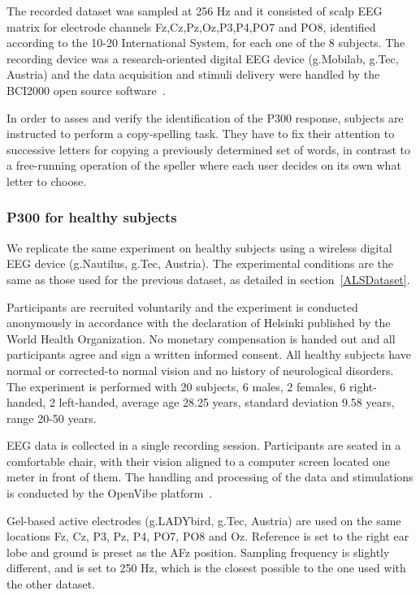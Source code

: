 \documentclass[entropy,article,submit,moreauthors,pdftex,10pt,a4paper]{mdpi}
\begin{document}
The recorded dataset was sampled at 256 Hz and it consisted of scalp EEG matrix for electrode channels Fz,Cz,Pz,Oz,P3,P4,PO7 and PO8, identified according to the 10-20 International System,  for each one of the 8 subjects.   The recording device was a research-oriented digital EEG device (g.Mobilab, g.Tec, Austria) and the data acquisition and stimuli delivery were handled by the BCI2000 open source software~\citep{Schalk2004}.

In order to asses and verify the identification of the P300 response, subjects are instructed to perform a copy-spelling task. They have to fix their attention to successive letters for copying a previously determined set of words, in contrast to a free-running operation of the speller where each user decides on its own what letter to choose.

\subsubsection{P300 for healthy subjects}

We replicate the same experiment on healthy subjects using a wireless digital EEG device (g.Nautilus, g.Tec, Austria).  The experimental conditions are the same as those used for the previous dataset, as detailed in section~\ref{ALSDataset}.

Participants are recruited voluntarily and the experiment is conducted anonymously in accordance with the declaration of Helsinki published by the World Health Organization.  No monetary compensation is handed out and all participants agree and sign a written informed consent.  All healthy subjects have normal or corrected-to normal vision and no history of neurological disorders. The experiment is performed with 20 subjects, 6 males, 2 females, 6 right-handed, 2 left-handed, average age 28.25 years, standard deviation  9.58 years, range 20-50 years.

EEG data is collected in a single recording session. Participants are seated in a comfortable chair, with their vision aligned to a computer screen located one meter in front of them.  The handling and processing of the data and stimulations is conducted by the OpenVibe platform~\citep{Renard2010}. 

Gel-based active electrodes (g.LADYbird, g.Tec, Austria) are used on the same locations Fz, Cz, P3, Pz, P4, PO7, PO8 and Oz.  Reference is set to the right ear lobe and ground is preset as the AFz position.   Sampling frequency is slightly different, and is set to 250 Hz, which is the closest possible to the one used with the other dataset.
\end{document}
